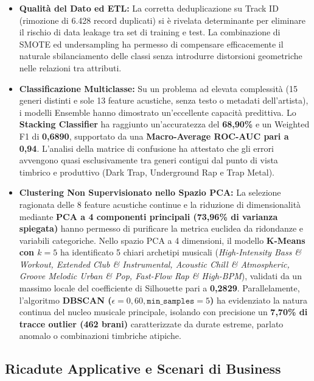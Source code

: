 \documentclass[12pt,a4paper]{article}
\begin{document}
\begin{itemize}
    \item \textbf{Qualità del Dato ed ETL:} La corretta deduplicazione su Track ID (rimozione di 6.428 record duplicati) si è rivelata determinante per eliminare il rischio di data leakage tra set di training e test. La combinazione di SMOTE ed undersampling ha permesso di compensare efficacemente il naturale sbilanciamento delle classi senza introdurre distorsioni geometriche nelle relazioni tra attributi.
    \item \textbf{Classificazione Multiclasse:} Su un problema ad elevata complessità (15 generi distinti e sole 13 feature acustiche, senza testo o metadati dell'artista), i modelli Ensemble hanno dimostrato un'eccellente capacità predittiva. Lo \textbf{Stacking Classifier} ha raggiunto un'accuratezza del \textbf{68,90\%} e un Weighted F1 di \textbf{0,6890}, supportato da una \textbf{Macro-Average ROC-AUC pari a 0,94}. L'analisi della matrice di confusione ha attestato che gli errori avvengono quasi esclusivamente tra generi contigui dal punto di vista timbrico e produttivo (Dark Trap, Underground Rap e Trap Metal).
    \item \textbf{Clustering Non Supervisionato nello Spazio PCA:} La selezione ragionata delle 8 feature acustiche continue e la riduzione di dimensionalità mediante \textbf{PCA a 4 componenti principali (73,96\% di varianza spiegata)} hanno permesso di purificare la metrica euclidea da ridondanze e variabili categoriche. Nello spazio PCA a 4 dimensioni, il modello \textbf{K-Means con $k=5$} ha identificato 5 chiari archetipi musicali (\textit{High-Intensity Bass \& Workout, Extended Club \& Instrumental, Acoustic Chill \& Atmospheric, Groove Melodic Urban \& Pop, Fast-Flow Rap \& High-BPM}), validati da un massimo locale del coefficiente di Silhouette pari a \textbf{0,2829}. Parallelamente, l'algoritmo \textbf{DBSCAN ($\epsilon = 0,60, \texttt{min\_samples} = 5$)} ha evidenziato la natura continua del nucleo musicale principale, isolando con precisione un \textbf{7,70\% di tracce outlier (462 brani)} caratterizzate da durate estreme, parlato anomalo o combinazioni timbriche atipiche.
\end{itemize}

\subsection{Ricadute Applicative e Scenari di Business}
\end{document}
